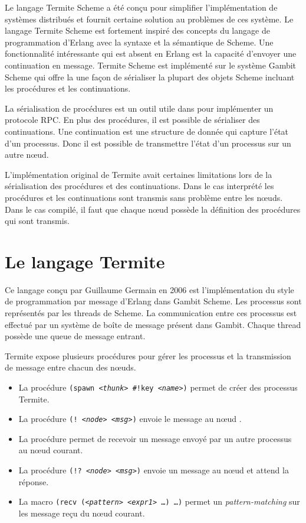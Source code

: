 Le langage Termite Scheme\cite{DBLP:conf/erlang/Germain06} a été conçu
pour simplifier l'implémentation de systèmes distribués et fournit
certaine solution au problèmes de ces système. Le langage Termite Scheme est
fortement inspiré des concepts du langage de programmation d'Erlang avec la
syntaxe et la sémantique de Scheme. Une fonctionnalité intéressante qui est
absent en Erlang est la capacité d'envoyer une continuation en message.
Termite Scheme est implémenté sur le système Gambit Scheme qui offre la
une façon de sérialiser la plupart des objets Scheme incluant les
procédures et les continuations.

La sérialisation de procédures est un outil utile dans pour implémenter
un protocole RPC. En plus des procédures, il est possible de sérialiser
des continuations. Une continuation est une structure de donnée qui capture
l'état d'un processus. Donc il est possible de transmettre l'état d'un
processus sur un autre nœud.

L'implémentation original de Termite avait certaines limitations
lors de la sérialisation des procédures et des continuations. Dans
le cas interprété les procédures et les continuations sont transmis
sans problème entre les nœuds. Dans le cas compilé, il faut que
chaque nœud possède la définition des procédures qui sont transmis.


\section{Le langage Termite}

Ce langage conçu par Guillaume Germain en 2006 est l'implémentation
du style de programmation par message d'Erlang dans Gambit Scheme.
Les processus sont représentés par les threads de Scheme. La communication
entre ces processus est effectué par un système de boîte de message
présent dans Gambit. Chaque thread possède une queue de message entrant.

Termite expose plusieurs procédures pour gérer les processus et la transmission
de message entre chacun des nœuds.

\begin{itemize}
  \item La procédure \texttt{(spawn \textit{<thunk>} \#!key \textit{<name>})} permet de
    créer des processus Termite.

  \item La procédure \texttt{(! \textit{<node>} \textit{<msg>})} envoie le message
     au nœud .

  \item La procédure  permet de recevoir un message
    envoyé par un autre processus au nœud courant.

  \item La procédure \texttt{(!? \textit{<node>} \textit{<msg>})} envoie un message au
    nœud  et attend la réponse.

  \item La macro \texttt{(recv (\textit{<pattern>} \textit{<expr1>} \dots) \dots)}
    permet un \textit{pattern-matching} sur les message reçu du nœud courant.

\end{itemize}

